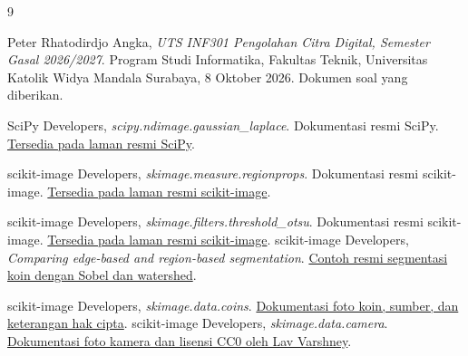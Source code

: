 \clearpage
\begin{thebibliography}{9}
\raggedright
\small
{}
\setlength{\itemsep}{3pt}
\setlength{\parskip}{0pt}
Peter Rhatodirdjo Angka,
\textit{UTS INF301 Pengolahan Citra Digital, Semester Gasal 2026/2027}.
Program Studi Informatika, Fakultas Teknik, Universitas Katolik Widya
Mandala Surabaya, 8 Oktober 2026. Dokumen soal yang diberikan.

SciPy Developers,
\textit{scipy.ndimage.gaussian\_laplace}.
Dokumentasi resmi SciPy.
\href{https://docs.scipy.org/doc/scipy/reference/generated/scipy.ndimage.gaussian_laplace.html}{Tersedia pada laman resmi SciPy}.

scikit-image Developers,
\textit{skimage.measure.regionprops}.
Dokumentasi resmi scikit-image.
\href{https://scikit-image.org/docs/stable/api/skimage.measure.html#skimage.measure.regionprops}{Tersedia pada laman resmi scikit-image}.

scikit-image Developers,
\textit{skimage.filters.threshold\_otsu}.
Dokumentasi resmi scikit-image.
\href{https://scikit-image.org/docs/stable/api/skimage.filters.html#skimage.filters.threshold_otsu}{Tersedia pada laman resmi scikit-image}.
scikit-image Developers,
\textit{Comparing edge-based and region-based segmentation}.
\href{https://scikit-image.org/docs/stable/auto_examples/applications/plot_coins_segmentation.html}{Contoh resmi segmentasi koin dengan Sobel dan watershed}.

scikit-image Developers, \textit{skimage.data.coins}.
\href{https://scikit-image.org/docs/stable/api/skimage.data.html#skimage.data.coins}{Dokumentasi foto koin, sumber, dan keterangan hak cipta}.
scikit-image Developers, \textit{skimage.data.camera}.
\href{https://scikit-image.org/docs/stable/api/skimage.data.html#skimage.data.camera}{Dokumentasi foto kamera dan lisensi CC0 oleh Lav Varshney}.
\end{thebibliography}
